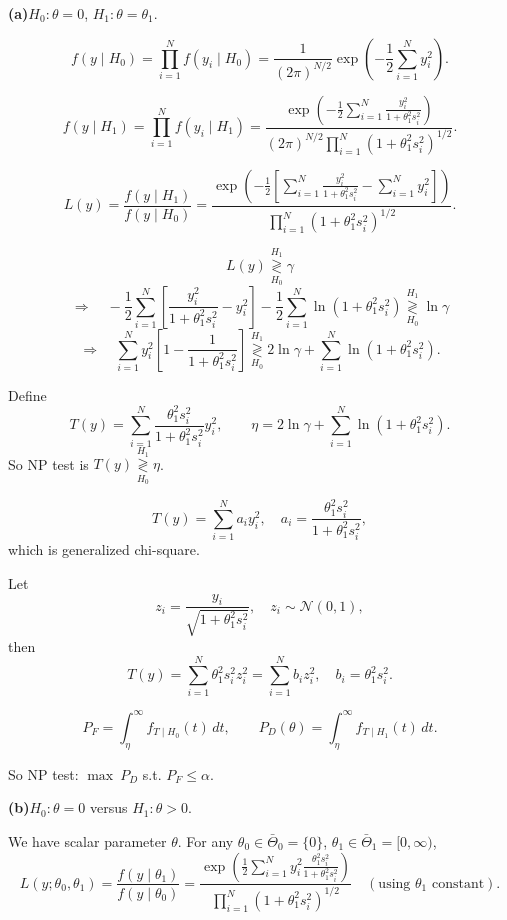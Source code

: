 \documentclass[12pt,a4paper,onecolumn]{exam}
\begin{document}
\begin{solution}

\textbf{(a)}\quad $H_0:\theta=0$, $H_1:\theta=\theta_1$.

\[
f(y\mid H_0)=\prod_{i=1}^{N}f(y_i\mid H_0)
=\frac{1}{(2\pi)^{N/2}}\exp\left(-\frac{1}{2}\sum_{i=1}^{N}y_i^2\right).
\]

\[
f(y\mid H_1)=\prod_{i=1}^{N}f(y_i\mid H_1)
=\frac{\exp\left(-\frac{1}{2}\sum_{i=1}^{N}\frac{y_i^2}{1+\theta_1^2 s_i^2}\right)}{(2\pi)^{N/2}\prod_{i=1}^{N}(1+\theta_1^2 s_i^2)^{1/2}}.
\]

\[
L(y)=\frac{f(y\mid H_1)}{f(y\mid H_0)}
=\frac{\exp\left(-\frac{1}{2}\left[\sum_{i=1}^{N}\frac{y_i^2}{1+\theta_1^2 s_i^2}-\sum_{i=1}^{N}y_i^2\right]\right)}{\prod_{i=1}^{N}(1+\theta_1^2 s_i^2)^{1/2}}.
\]

\[
L(y)\underset{H_0}{\overset{H_1}{\gtrless}}\gamma
\]
\[
\Rightarrow\quad
-\frac{1}{2}\sum_{i=1}^{N}\left[\frac{y_i^2}{1+\theta_1^2 s_i^2}-y_i^2\right]
-\frac{1}{2}\sum_{i=1}^{N}\ln(1+\theta_1^2 s_i^2)
\underset{H_0}{\overset{H_1}{\gtrless}}\ln\gamma
\]
\[
\Rightarrow\quad
\sum_{i=1}^{N}y_i^2\left[1-\frac{1}{1+\theta_1^2 s_i^2}\right]
\underset{H_0}{\overset{H_1}{\gtrless}}
2\ln\gamma+\sum_{i=1}^{N}\ln(1+\theta_1^2 s_i^2).
\]

Define
\[
T(y)=\sum_{i=1}^{N}\frac{\theta_1^2 s_i^2}{1+\theta_1^2 s_i^2}y_i^2,
\qquad
\eta=2\ln\gamma+\sum_{i=1}^{N}\ln(1+\theta_1^2 s_i^2).
\]
So NP test is $T(y)\underset{H_0}{\overset{H_1}{\gtrless}}\eta$.

\[
T(y)=\sum_{i=1}^{N}a_i y_i^2,
\quad a_i=\frac{\theta_1^2 s_i^2}{1+\theta_1^2 s_i^2},
\]
which is generalized chi-square.

Let
\[
z_i=\frac{y_i}{\sqrt{1+\theta_1^2 s_i^2}},\quad z_i\sim\mathcal{N}(0,1),
\]
then
\[
T(y)=\sum_{i=1}^{N}\theta_1^2 s_i^2 z_i^2=\sum_{i=1}^{N}b_i z_i^2,
\quad b_i=\theta_1^2 s_i^2.
\]

\[
P_F=\int_{\eta}^{\infty} f_{T\mid H_0}(t)\,dt,
\qquad
P_D(\theta)=\int_{\eta}^{\infty} f_{T\mid H_1}(t)\,dt.
\]

So NP test: $\max\ P_D$ s.t. $P_F\le\alpha$.

\textbf{(b)}\quad $H_0:\theta=0$ versus $H_1:\theta>0$.

We have scalar parameter $\theta$.
For any $\theta_0\in\bar\Theta_0=\{0\}$, $\theta_1\in\bar\Theta_1=[0,\infty)$,
\[
L(y;\theta_0,\theta_1)=\frac{f(y\mid\theta_1)}{f(y\mid\theta_0)}
=\frac{\exp\left(\frac{1}{2}\sum_{i=1}^{N}y_i^2\frac{\theta_1^2 s_i^2}{1+\theta_1^2 s_i^2}\right)}{\prod_{i=1}^{N}(1+\theta_1^2 s_i^2)^{1/2}}
\quad (\text{using }\theta_1\text{ constant}).
\]


\end{solution}
\end{document}
